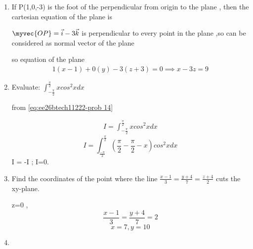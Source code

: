 \begin{enumerate}[label=\thesubsection.\arabic*, ref=\thesubsection.\theenumi]
The distance between parallel planes $2x+y-2z-6=0$ and $4x+2y-4z=0$ is units

\solution

$4x+2y-4z= 12$ and $4x+2y-4z=0$ 

distance between parallel planes $ax +by +cz= d_1 $ and $ax+by +cz=d_2$ is

$\vec{u}=4\vec{i}+2\vec{j}-4\vec{k}$

from \eqref{eq:ee26btech11222-prob 13}
\begin{align}
 D=\left|\frac{d_1-d_2}{\vert|u|\vert{}}\right|
 \end{align}

$$D=\left\vert{}\frac{12}{\sqrt{4^2 + 2^2+ 4^2}}\right \vert{}$$ , D =2 .

\begin{center}
	or 
\end{center}
\item 
If P(1,0,-3) is the foot of the perpendicular from origin to the plane , then the cartesian equation of the plane is 

\solution 
$\myvec{OP}= \vec{i}-3\vec{k}$ is perpendicular to every point in the plane ,so  can be considered as normal vector of the plane 

so  equation of the plane 
\begin{align}
	1(x-1)+0(y)-3(z+3)=0 \implies x-3z=9
\end{align}  

\item 

Evaluate: $\int_{-\frac{\pi}{2}}^{\frac{\pi}{2}}xcos^{2}xdx$

\solution

from \eqref{eq:ee26btech11222-prob 14}

\begin{align}
I =\int_{-\frac{\pi}{2}}^{\frac{\pi}{2}}xcos^{2}xdx
\end{align}
$$I= \int _{\frac{-\pi}{2}}^{\frac{\pi}{2}}\left(\frac{\pi}{2}-\frac{\pi}{2}-x\right)cos^2 xdx$$ I = -I ; I=0.

\item

Find the coordinates of the point where the line $\frac{x-1}{3}=\frac{y+4}{7}=\frac{z+4}{2}$ cuts the xy-plane.   

\solution

z=0 , $$\frac{x-1}{3}= \frac{y+4}{7}=2$$ $$x=7 ,y=10$$

\item 


\end{enumerate}
